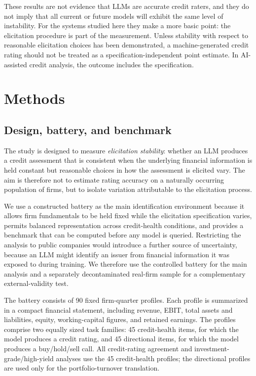 \documentclass[pdflatex,sn-nature,lineno]{sn-jnl}
\theoremstyle{thmstyleone}
\begin{document}
These results are not evidence that LLMs are accurate credit raters, and they do not imply that all
current or future models will exhibit the same level of instability. For the systems studied here they
make a more basic point: the elicitation procedure is part of the measurement. Unless stability with
respect to reasonable elicitation choices has been demonstrated, a machine-generated credit rating should
not be treated as a specification-independent point estimate. In AI-assisted credit analysis, the outcome
includes the specification.

\section{Methods}
\subsection{Design, battery, and benchmark}
The study is designed to measure \emph{elicitation stability}: whether an LLM produces a credit
assessment that is consistent when the underlying financial information is held constant but reasonable
choices in how the assessment is elicited vary. The aim is therefore not to estimate rating accuracy on a
naturally occurring population of firms, but to isolate variation attributable to the elicitation
process.

We use a constructed battery as the main identification environment because it allows firm fundamentals
to be held fixed while the elicitation specification varies, permits balanced representation across
credit-health conditions, and provides a benchmark that can be computed before any model is queried.
Restricting the analysis to public companies would introduce a further source of uncertainty,
because an LLM might identify an issuer from financial information it was exposed to during training. We
therefore use the controlled battery for the main analysis and a separately decontaminated real-firm
sample for a complementary external-validity test.

The battery consists of 90 fixed firm-quarter profiles. Each profile is summarized in a compact financial
statement, including revenue, EBIT, total assets and liabilities, equity, working-capital figures, and
retained earnings. The profiles comprise two equally sized task families: 45 credit-health items, for
which the model produces a credit rating, and 45 directional items, for which the model produces a
buy/hold/sell call. All credit-rating agreement and investment-grade/high-yield analyses use the 45
credit-health profiles; the directional profiles are used only for the portfolio-turnover translation.
\end{document}
